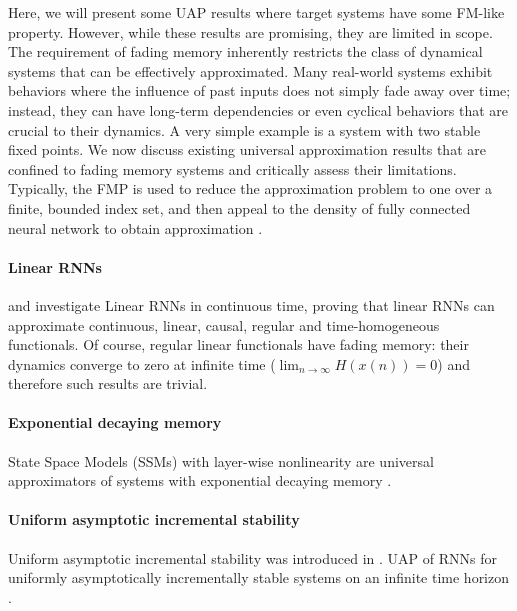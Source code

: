 \documentclass{article}
\newcounter{ct}
\begin{document}
Here, we will present some UAP results where target systems have some FM-like property.
However, while these results are promising, they are limited in scope.
The requirement of fading memory inherently restricts the class of dynamical systems that can be effectively approximated.
Many real-world systems exhibit behaviors where the influence of past inputs does not simply fade away over time; instead, they can have long-term dependencies or even cyclical behaviors that are crucial to their dynamics.
A very simple example is a system with two stable fixed points.
We now discuss existing universal approximation results that are confined to fading memory systems and critically assess their limitations.
%
Typically, the FMP is used to reduce the approximation problem to one over a finite, bounded index set, and then appeal to the density of fully connected neural network to obtain approximation  \citep{gonon2021fading}. %


\paragraph{Linear RNNs}
\citet{li2020curse} and \citet{li2022approximation} investigate Linear RNNs in continuous time, %
proving that linear RNNs can approximate continuous, linear, causal, regular and time-homogeneous functionals. %
Of course, regular linear functionals have fading memory: their dynamics converge to zero at infinite time ($\lim_{n\rightarrow\infty} H(x(n)) = 0$) and therefore such results are trivial.
 

\paragraph{Exponential decaying memory}
State Space Models (SSMs) with layer-wise nonlinearity are universal approximators of systems with exponential decaying memory  \citep{wang2024state}.


\paragraph{Uniform asymptotic incremental stability}
Uniform asymptotic incremental stability was introduced in  \citep{pavlov2006uniform}.
UAP of RNNs for uniformly asymptotically incrementally stable systems on an infinite time horizon \citep{hanson2020universal, hanson2021learning}.
\end{document}
